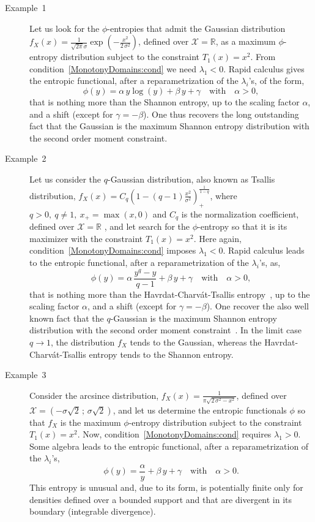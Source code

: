 \documentclass[entropy,article,submit,moreauthors,pdftex]{Definitions/mdpi}
\newcommand{\SZ}[1]{{\color{blue} #1}}
\def\Rset{\mathbb{R}}
\def\X{\mathcal{X}}
\begin{document}
\begin{description}
\item[Example~1]  \SZ{Let  us  look  for the  $\phi$-entropies  that  admit  the
  Gaussian  distribution $f_X(x)  = \frac{1}{\sqrt{2  \pi} \sigma}  \exp\left( -
  \frac{x^2}{2 \,  \sigma^2} \right)$, defined over  $\X = \Rset$, as  a maximum
  $\phi$-entropy distribution  subject to  the constraint  $T_1(x) =  x^2$. From
  condition~\ref{MonotonyDomains:cond} we need} $\lambda_1 < 0$.  Rapid calculus
  \SZ{gives  the}   entropic  functional,  after  a   reparametrization  of  the
  $\lambda_i$'s, of  the form, $$\phi(y) =  \alpha \, y  \log(y) + \beta \,  y +
  \gamma \quad  \mbox{with} \quad \alpha  > 0,$$ that  is nothing more  than the
  Shannon entropy,  up to the scaling  factor $\alpha$, and a  shift (except for
  $\gamma =  -\beta$).  One  thus recovers  the long  outstanding fact  that the
  Gaussian is  the maximum  Shannon entropy distribution  with the  second order
  moment constraint.
%
\item[Example~2] \SZ{Let us consider  the} $q$-Gaussian distribution, also known
  as Tsallis distribution,  $f_X(x) = C_q \left( 1  - (q-1) \frac{x^2}{\sigma^2}
  \right)_+^{\frac{1}{1-q}}$, where $q > 0, \: q  \ne 1, \: x_+ = \max(x,0)$ and
  $C_q$ is the normalization coefficient, defined over $\X = \Rset$\SZ{, and let
    search  for the  $\phi$-entropy  so that  it  is its  maximizer  } with  the
  constraint        $T_1(x)        =        x^2$.         \SZ{Here        again,
    condition~\ref{MonotonyDomains:cond}}  imposes   $\lambda_1  <   0$.   Rapid
  calculus leads  to the entropic  functional, after a reparametrization  of the
  $\lambda_i$'s, as,  $$\phi(y) =  \alpha \,  \frac{y^q-y}{q-1} +  \beta \,  y +
  \gamma \quad  \mbox{with} \quad \alpha  > 0,$$ that  is nothing more  than the
  Havrdat-Charv\'at-Tsallis entropy~\cite{HavCha67, Dar70,  Tsa88, CosHer03}, up
  to the  scaling factor $\alpha$, and  a shift (except for  $\gamma = -\beta$).
  One recover  the also  well known  fact that the  $q$-Gaussian is  the maximum
  Shannon    entropy    distribution    with    the    second    order    moment
  constraint~\cite{CosHer03}.  In  the limit  case $q  \to 1$,  the distribution
  $f_X$  tends to  the Gaussian,  whereas the  Havrdat-Charv\'at-Tsallis entropy
  tends to the Shannon entropy.
%
\item[Example~3] \SZ{Consider the} arcsince distribution, $f_X(x) = \frac{1}{\pi
  \sqrt{2 \, \sigma^2 - x^2}}$, defined over $\X = \left( -\sigma \sqrt2 \, ; \,
  \sigma  \sqrt2 \right)$,  \SZ{and let  us determine  the entropic  functionals
    $\phi$ so that $f_X$ is  the maximum $\phi$-entropy distribution subject to}
  the constraint $T_1(x)  = x^2$.  \SZ{Now, condition~\ref{MonotonyDomains:cond}
    requires}  $\lambda_1  >  0$.   \SZ{Some}  algebra  leads  to  the  entropic
  functional,  after  a  reparametrization  of the  $\lambda_i$'s,  $$\phi(y)  =
  \frac{\alpha}{y} + \beta  \, y + \gamma \quad \mbox{with}  \quad \alpha > 0.$$
  This entropy is \SZ{unusual} and, due  to its form, is potentially finite only
  for densities  defined over a  bounded support and  that are divergent  in its
  boundary (integrable divergence).
\end{description}
\end{document}
